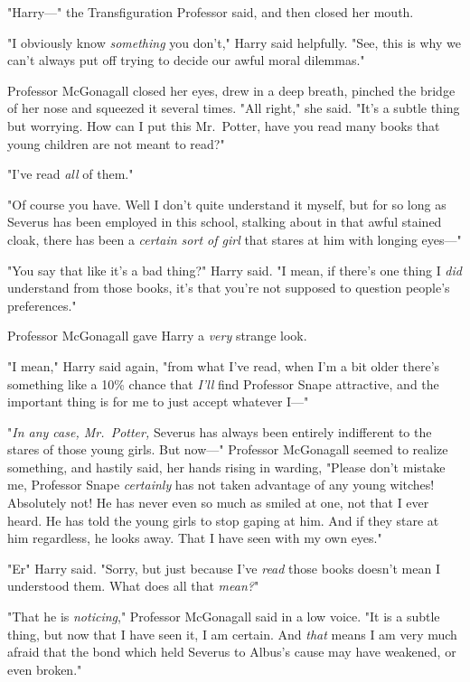 "Harry\mbox{---}" the Transfiguration Professor said, and then closed her mouth.

"I obviously know \emph{something} you don't," Harry said helpfully. "See, this
is why we can't always put off trying to decide our awful moral dilemmas."

Professor McGonagall closed her eyes, drew in a deep breath, pinched the bridge
of her nose and squeezed it several times. "All right," she said. "It's a
subtle thing{\el} but worrying. How can I put this{\el} Mr.~Potter, have
you read many books that young children are not meant to read?"

"I've read \emph{all} of them."

"Of course you have. Well{\el} I don't quite understand it myself, but for
so long as Severus has been employed in this school, stalking about in that
awful stained cloak, there has been a \emph{certain sort of girl} that stares
at him with longing eyes\mbox{---}"

"You say that like it's a bad thing?" Harry said. "I mean, if there's one thing
I \emph{did} understand from those books, it's that you're not supposed to
question people's preferences."

Professor McGonagall gave Harry a \emph{very} strange look.

"I mean," Harry said again, "from what I've read, when I'm a bit older there's
something like a 10\% chance that \emph{I'll} find Professor Snape attractive,
and the important thing is for me to just accept whatever I\mbox{---}"

"\emph{In any case, Mr.~Potter,} Severus has always been entirely indifferent
to the stares of those young girls. But now\mbox{---}" Professor McGonagall seemed to
realize something, and hastily said, her hands rising in warding, "Please don't
mistake me, Professor Snape \emph{certainly} has not taken advantage of any
young witches! Absolutely not! He has never even so much as smiled at one, not
that I ever heard. He has told the young girls to stop gaping at him. And if
they stare at him regardless, he looks away. That I have seen with my own eyes."

"Er{\el}" Harry said. "Sorry, but just because I've \emph{read} those books
doesn't mean I understood them. What does all that \emph{mean?}"

"That he is \emph{noticing}," Professor McGonagall said in a low voice. "It is
a subtle thing, but now that I have seen it, I am certain. And \emph{that}
means{\el} I am very much afraid{\el} that the bond which held Severus to
Albus's cause{\el} may have weakened, or even broken."

